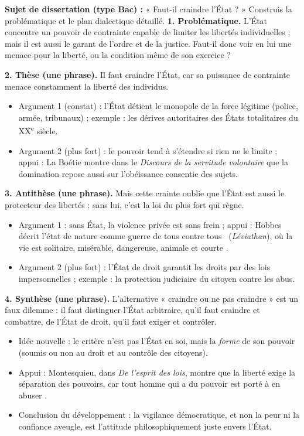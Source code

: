 \documentclass[11pt]{article}
\begin{document}
\begin{exoresolu}
\textbf{Sujet de dissertation (type Bac) :} « Faut-il craindre l'État ? » Construis la problématique et le plan dialectique détaillé.
\tcblower
\textbf{1. Problématique.} L'État concentre un pouvoir de contrainte capable de limiter les libertés individuelles ; mais il est aussi le garant de l'ordre et de la justice. Faut-il donc voir en lui une menace pour la liberté, ou la condition même de son exercice ?

\textbf{2. Thèse (une phrase).} Il faut craindre l'État, car sa puissance de contrainte menace constamment la liberté des individus.
\begin{itemize}
\item Argument 1 (constat) : l'État détient le monopole de la force légitime (police, armée, tribunaux) ; exemple : les dérives autoritaires des États totalitaires du XX\textsuperscript{e} siècle.
\item Argument 2 (plus fort) : le pouvoir tend à s'étendre si rien ne le limite ; appui : La Boétie montre dans le \emph{Discours de la servitude volontaire} que la domination repose aussi sur l'obéissance consentie des sujets.
\end{itemize}

\textbf{3. Antithèse (une phrase).} Mais cette crainte oublie que l'État est aussi le protecteur des libertés : sans lui, c'est la loi du plus fort qui règne.
\begin{itemize}
\item Argument 1 : sans État, la violence privée est sans frein ; appui : Hobbes décrit l'état de nature comme \guillemotleft guerre de tous contre tous \guillemotright\ (\emph{Léviathan}), où la vie est \guillemotleft solitaire, misérable, dangereuse, animale et courte \guillemotright.
\item Argument 2 (plus fort) : l'État de droit garantit les droits par des lois impersonnelles ; exemple : la protection judiciaire du citoyen contre les abus.
\end{itemize}

\textbf{4. Synthèse (une phrase).} L'alternative « craindre ou ne pas craindre » est un faux dilemme : il faut distinguer l'État arbitraire, qu'il faut craindre et combattre, de l'État de droit, qu'il faut exiger et contrôler.
\begin{itemize}
\item Idée nouvelle : le critère n'est pas l'État en soi, mais la \emph{forme} de son pouvoir (soumis ou non au droit et au contrôle des citoyens).
\item Appui : Montesquieu, dans \emph{De l'esprit des lois}, montre que la liberté exige la séparation des pouvoirs, car \guillemotleft tout homme qui a du pouvoir est porté à en abuser \guillemotright.
\item Conclusion du développement : la vigilance démocratique, et non la peur ni la confiance aveugle, est l'attitude philosophiquement juste envers l'État.
\end{itemize}
\end{exoresolu}
\end{document}
